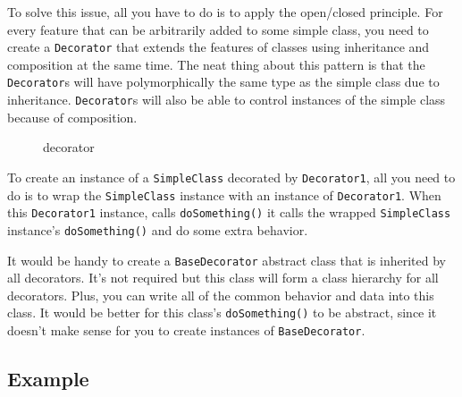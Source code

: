 To solve this issue, all you have to do is to apply the open/closed
principle. For every feature that can be arbitrarily added to some
simple class, you need to create a \texttt{Decorator} that extends the
features of classes using inheritance and composition at the same time.
The neat thing about this pattern is that the \texttt{Decorator}s will
have polymorphically the same type as the simple class due to
inheritance. \texttt{Decorator}s will also be able to control instances
of the simple class because of composition.

\begin{figure}
\centering
{}
\caption{decorator}
\end{figure}

To create an instance of a \texttt{SimpleClass} decorated by
\texttt{Decorator1}, all you need to do is to wrap the
\texttt{SimpleClass} instance with an instance of \texttt{Decorator1}.
When this \texttt{Decorator1} instance, calls \texttt{doSomething()} it
calls the wrapped \texttt{SimpleClass} instance's \texttt{doSomething()}
and do some extra behavior.

\begin{Shaded}
\begin{Highlighting}[]

\NormalTok{):}
\end{Highlighting}
\end{Shaded}

It would be handy to create a \texttt{BaseDecorator} abstract class that
is inherited by all decorators. It's not required but this class will
form a class hierarchy for all decorators. Plus, you can write all of
the common behavior and data into this class. It would be better for
this class's \texttt{doSomething()} to be abstract, since it doesn't
make sense for you to create instances of \texttt{BaseDecorator}.

\subsection{Example}\label{structural-patterns.md__example}

